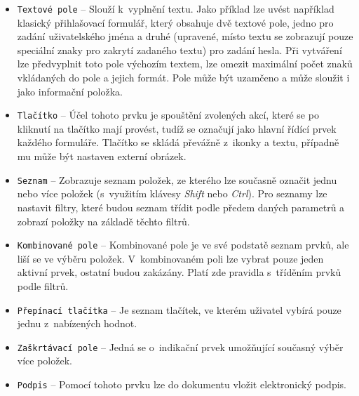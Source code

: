 	\begin{itemize}
	\item \verb|Textové pole| -- Slouží k~vyplnění textu. Jako příklad lze uvést například klasický přihlašovací formulář, který obsahuje dvě textové pole, jedno pro zadání uživatelského jména a druhé (upravené, místo textu se zobrazují pouze speciální znaky pro zakrytí zadaného textu)  pro zadání hesla. Při vytváření lze předvyplnit toto pole výchozím textem, lze omezit maximální počet znaků vkládaných do pole a jejich formát. Pole může být uzamčeno a může sloužit i jako informační položka.
	\item \verb|Tlačítko| -- Účel tohoto prvku je spouštění zvolených akcí, které se po kliknutí na tlačítko mají provést, tudíž se označují jako hlavní řídící prvek každého formuláře. Tlačítko se skládá převážně z~ikonky a textu, případně mu může být nastaven externí obrázek.
	\item \verb|Seznam| -- Zobrazuje seznam položek, ze kterého lze současně označit jednu nebo více položek (s~využitím klávesy \textit{Shift} nebo \textit{Ctrl}). Pro seznamy lze nastavit filtry, které budou seznam třídit podle předem daných parametrů a zobrazí položky na základě těchto filtrů.
	\item \verb|Kombinované pole| -- Kombinované pole je ve své podstatě seznam prvků, ale liší se ve výběru položek. V~kombinovaném poli lze vybrat pouze jeden aktivní prvek, ostatní budou zakázány. Platí zde pravidla s~tříděním prvků podle filtrů.
	\item \verb|Přepínací tlačítka| -- Je seznam tlačítek, ve kterém uživatel vybírá pouze jednu z~nabízených hodnot.
	\item \verb|Zaškrtávací pole| -- Jedná se o~indikační prvek umožňující současný výběr více položek.
	\item \verb|Podpis| -- Pomocí tohoto prvku lze do dokumentu vložit elektronický podpis.
	\end{itemize}